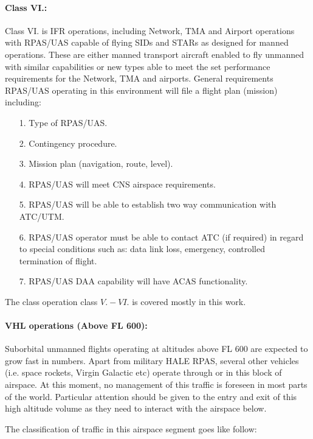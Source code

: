 \paragraph{Class VI.:} Class VI. is IFR operations, including Network, TMA and Airport operations with RPAS/UAS capable of flying SIDs and STARs as designed for manned operations. These are either manned transport aircraft enabled to fly unmanned with similar capabilities or new types able to meet the set performance requirements for the Network, TMA and airports. General requirements RPAS/UAS operating in this environment will file a flight plan (mission) including:
    \begin{itemize}
        \item[1.] Type of RPAS/UAS.
        \item[2.] Contingency procedure.
        \item[3.] Mission plan (navigation, route, level).
        \item[4.] RPAS/UAS will meet CNS airspace requirements.
        \item[5.] RPAS/UAS will be able to establish two way communication with ATC/UTM.
        \item[6.] RPAS/UAS operator must be able to contact ATC (if required) in regard to special conditions such as: data link loss, emergency, controlled termination of flight.
        \item[7.] RPAS/UAS DAA capability will have ACAS functionality.
    \end{itemize}

\begin{note}
    The class operation class $V.-VI.$ is covered mostly in this work.
\end{note}

\paragraph{VHL operations (Above FL 600):} Suborbital unmanned flights operating at altitudes above FL 600 are expected to grow fast in numbers. Apart from military HALE RPAS, several other vehicles (i.e. space rockets, Virgin Galactic etc) operate through or in this block of airspace. At this moment, no management of this traffic is foreseen in most parts of the world. Particular attention should be given to the entry and exit of this high altitude volume as they need to interact with the airspace below.

\noindent The classification of traffic in this airspace segment goes like follow:


